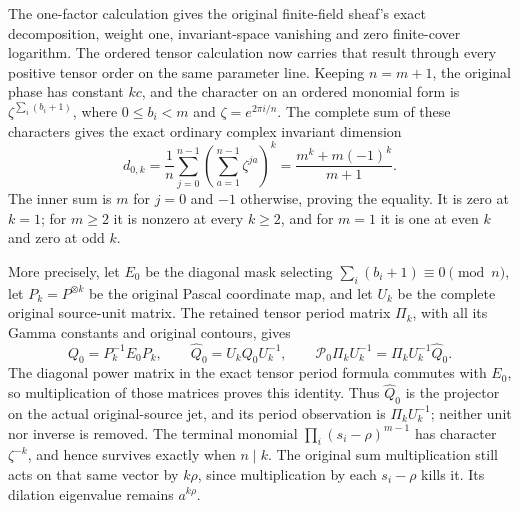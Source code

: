 The one-factor calculation gives the original finite-field sheaf's
exact decomposition, weight one, invariant-space vanishing and zero
finite-cover logarithm.  The ordered tensor calculation now carries
that result through every positive tensor order on the same parameter
line.  Keeping \(n=m+1\), the original phase has constant \(kc\),
and the character on an ordered monomial form is
\(\zeta^{\sum_i(b_i+1)}\), where \(0\leq b_i<m\) and
\(\zeta=e^{2\pi i/n}\).  The complete sum of these characters
gives the exact ordinary complex invariant dimension
\[
 d_{0,k}=\frac1n\sum_{j=0}^{n-1}
           \left(\sum_{a=1}^{n-1}\zeta^{ja}\right)^k
        =\frac{m^k+m(-1)^k}{m+1}.
 \tag{SPBT.1}\label{eq:spbt1}
\]
The inner sum is \(m\) for \(j=0\) and \(-1\) otherwise,
proving the equality.  It is zero at \(k=1\); for \(m\geq2\)
it is nonzero at every \(k\geq2\), and for \(m=1\) it is one
at even \(k\) and zero at odd \(k\).

More precisely, let \(E_0\) be the diagonal mask selecting
\(\sum_i(b_i+1)\equiv0\pmod n\), let
\(P_k=P^{\otimes k}\) be the original Pascal coordinate map,
and let \(U_k\) be the complete original source-unit matrix.
The retained tensor period matrix \(\Pi_k\), with all its
Gamma constants and original contours, gives
\[
 Q_0=P_k^{-1}E_0P_k,\qquad
 \widehat Q_0=U_kQ_0U_k^{-1},\qquad
 \mathcal P_0\Pi_kU_k^{-1}
       =\Pi_kU_k^{-1}\widehat Q_0.
 \tag{SPBT.2}\label{eq:spbt2}
\]
The diagonal power matrix in the exact tensor period formula
commutes with \(E_0\), so multiplication of those matrices
proves this identity.  Thus \(\widehat Q_0\) is the projector
on the actual original-source jet, and its period observation
is \(\Pi_kU_k^{-1}\); neither unit nor inverse is removed.
The terminal monomial \(\prod_i(s_i-\rho)^{m-1}\) has
character \(\zeta^{-k}\), and hence survives exactly when
\(n\mid k\).  The original sum multiplication still acts on
that same vector by \(k\rho\), since multiplication by
each \(s_i-\rho\) kills it.  Its dilation eigenvalue remains
\(a^{k\rho}\).

